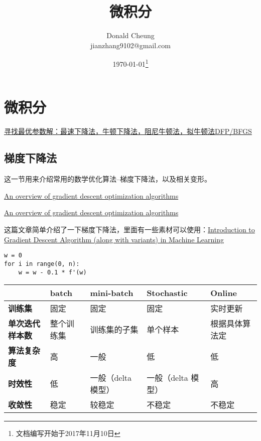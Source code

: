 \documentclass[a4paper,10pt]{ctexbook}
\title{微积分}
\author{Donald Cheung\\jianzhang9102@gmail.com}
\date{\today\footnote{文档编写开始于2017年11月10日}}
\begin{document}
    \maketitle
    \tableofcontents
\fi

\chapter{微积分}
\href{http://dataunion.org/20714.html}{寻找最优参数解：最速下降法，牛顿下降法，阻尼牛顿法，拟牛顿法DFP/BFGS}

\section{梯度下降法}
这一节用来介绍常用的数学优化算法--梯度下降法，以及相关变形。

\href{https://arxiv.org/abs/1609.04747}{An overview of gradient descent optimization algorithms}

\href{http://ruder.io/optimizing-gradient-descent}{An overview of gradient descent optimization algorithms}

这篇文章简单介绍了一下梯度下降法，里面有一些素材可以使用：\href{https://www.analyticsvidhya.com/blog/2017/03/introduction-to-gradient-descent-algorithm-along-its-variants}{Introduction to Gradient Descent Algorithm (along with variants) in Machine Learning}

\begin{verbatim}
w = 0
for i in range(0, n):
    w = w - 0.1 * f'(w)
\end{verbatim}

\begin{table}[H]
    \begin{tabular}{|l|l|l|l|l|}
        \hline
                                & \textbf{batch} & \textbf{mini-batch} & \textbf{Stochastic} & \textbf{Online} \\
        \hline
        \textbf{训练集}         & 固定       & 固定               & 固定               & 实时更新 \\
        \hline
        \textbf{单次迭代样本数} & 整个训练集 & 训练集的子集       & 单个样本           & 根据具体算法定 \\
        \hline
        \textbf{算法复杂度}     & 高         & 一般               & 低                 & 低 \\
        \hline
        \textbf{时效性}         & 低         & 一般（delta 模型） & 一般（delta 模型） & 高 \\
        \hline
        \textbf{收敛性}         & 稳定       & 较稳定             & 不稳定             & 不稳定 \\
        \hline
    \end{tabular}
\end{table}
        
\end{document}
